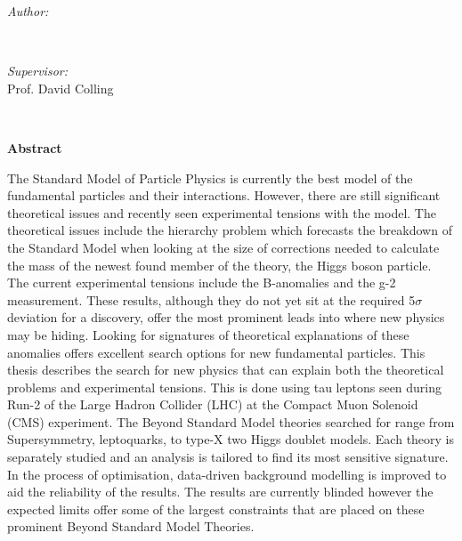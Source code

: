 \begin{titlepage}
\begin{center}
\begin{minipage}{0.4\textwidth}
\begin{flushleft} \large
\emph{Author:}\\
\@author %
\end{flushleft}
\end{minipage}
~
\begin{minipage}{0.4\textwidth}
\begin{flushright} \large
\emph{Supervisor:} \\
Prof. David Colling \\[1.2em] %
\end{flushright}
\end{minipage}\\[2cm]
\makeatother

\begin{centering}
\Large \textbf{Abstract}
\end{centering}
\end{center}

The Standard Model of Particle Physics is currently the best model of the fundamental particles and their interactions. However, there are still significant theoretical issues and recently seen experimental tensions with the model. The theoretical issues include the hierarchy problem which forecasts the breakdown of the Standard Model when looking at the size of corrections needed to calculate the mass of the newest found member of the theory, the Higgs boson particle. The current experimental tensions include the B-anomalies and the g-2 measurement. These results, although they do not yet sit at the required 5$\sigma$ deviation for a discovery, offer the most prominent leads into where new physics may be hiding. Looking for signatures of theoretical explanations of these anomalies offers excellent search options for new fundamental particles. This thesis describes the search for new physics that can explain both the theoretical problems and experimental tensions. This is done using tau leptons seen during Run-2 of the Large Hadron Collider (LHC) at the Compact Muon Solenoid (CMS) experiment. The Beyond Standard Model theories searched for range from Supersymmetry, leptoquarks, to type-X two Higgs doublet models. Each theory is separately studied and an analysis is tailored to find its most sensitive signature. In the process of optimisation, data-driven background modelling is improved to aid the reliability of the results. The results are currently blinded however the expected limits offer some of the largest constraints that are placed on these prominent Beyond Standard Model Theories.


\end{titlepage}